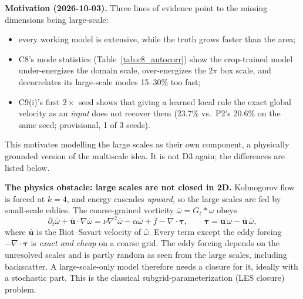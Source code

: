 \documentclass[11pt]{article}
\begin{document}
\textbf{Motivation (2026-10-03).} Three lines of evidence point to the
missing dimensions being large-scale:
\begin{itemize}[leftmargin=*]
\item every working model is extensive, while the truth grows faster than
  the area;
\item C8's mode statistics (Table~\ref{tab:c8_autocorr}) show the
  crop-trained model under-energizes the domain scale, over-energizes
  the $2\pi$ box scale, and decorrelates its large-scale modes 15--30\%
  too fast;
\item C9(i)'s first $2\times$ seed shows that giving a learned local rule
  the exact global velocity as an \emph{input} does not recover them
  (23.7\% vs.\ P2's 20.6\% on the same seed; provisional, 1 of 3 seeds).
\end{itemize}
This motivates modelling the large scales as their own component, a
physically grounded version of the multiscale idea. It is not D3 again;
the differences are listed below.

\textbf{The physics obstacle: large scales are not closed in 2D.}
Kolmogorov flow is forced at $k{=}4$, and energy cascades
\emph{upward}, so the large scales are fed by small-scale eddies. The
coarse-grained vorticity $\bar\omega = G_\ell*\omega$ obeys
\[
\partial_t\bar\omega + \bar{\mathbf u}\cdot\nabla\bar\omega
 = \nu\nabla^2\bar\omega - \alpha\bar\omega + \bar f
   - \nabla\cdot\boldsymbol\tau,\qquad
 \boldsymbol\tau = \overline{\mathbf u\,\omega}-\bar{\mathbf u}\,\bar\omega ,
\]
where $\bar{\mathbf u}$ is the Biot--Savart velocity of $\bar\omega$.
Every term except the eddy forcing $-\nabla\cdot\boldsymbol\tau$ is
\emph{exact and cheap} on a coarse grid. The eddy forcing depends on the
unresolved scales and is partly random as seen from the large scales,
including backscatter. A large-scale-only model therefore needs a
closure for it, ideally with a stochastic part. This is the classical
subgrid-parameterization (LES closure) problem.
\end{document}
